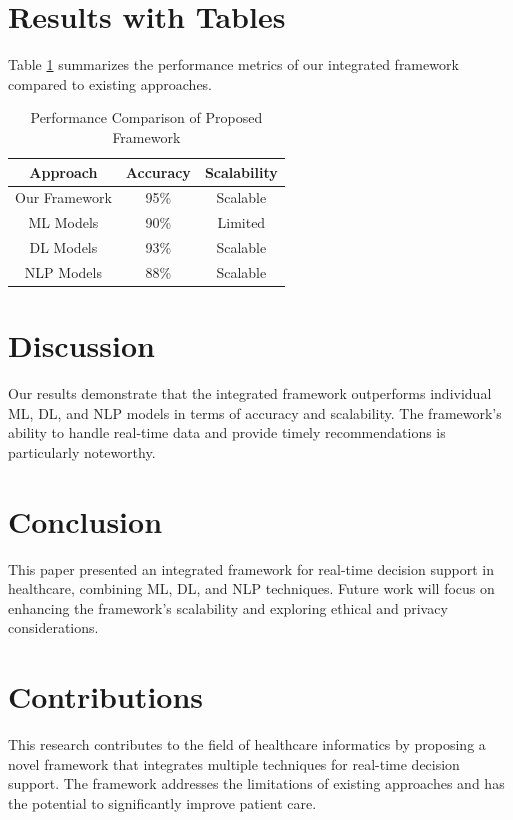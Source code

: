\documentclass{article}
\begin{document}
\section{Results with Tables}
\label{sec:results}

Table \ref{tab:results} summarizes the performance metrics of our integrated framework compared to existing approaches.

\begin{table}[htbp]
    \centering
    \caption{Performance Comparison of Proposed Framework}
    \label{tab:results}
    \begin{tabular}{|c|c|c|}
        \hline
        \textbf{Approach} & \textbf{Accuracy} & \textbf{Scalability} \\
        \hline
        Our Framework & 95\% & Scalable \\
        \hline
        ML Models & 90\% & Limited \\
        \hline
        DL Models & 93\% & Scalable \\
        \hline
        NLP Models & 88\% & Scalable \\
        \hline
    \end{tabular}
\end{table}

\section{Discussion}
\label{sec:discussion}

Our results demonstrate that the integrated framework outperforms individual ML, DL, and NLP models in terms of accuracy and scalability. The framework's ability to handle real-time data and provide timely recommendations is particularly noteworthy.

\section{Conclusion}
\label{sec:conclusion}

This paper presented an integrated framework for real-time decision support in healthcare, combining ML, DL, and NLP techniques. Future work will focus on enhancing the framework's scalability and exploring ethical and privacy considerations.

\section{Contributions}
\label{sec:contributions}

This research contributes to the field of healthcare informatics by proposing a novel framework that integrates multiple techniques for real-time decision support. The framework addresses the limitations of existing approaches and has the potential to significantly improve patient care.
\end{document}
